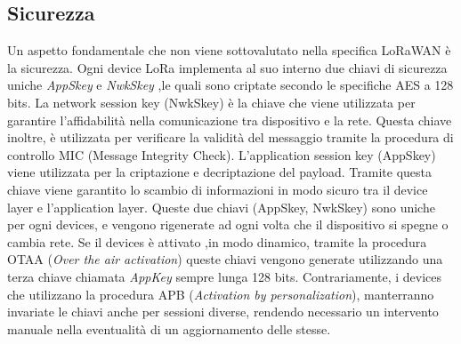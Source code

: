 \subsection{Sicurezza }
Un aspetto fondamentale che non viene sottovalutato nella specifica LoRaWAN è la
sicurezza. Ogni device LoRa implementa al suo interno due chiavi di sicurezza
uniche \emph{AppSkey} e \emph{NwkSkey} ,le quali sono criptate secondo le
specifiche AES a 128 bits.
La network session key (NwkSkey) è la chiave che viene utilizzata per garantire
l'affidabilità nella comunicazione tra dispositivo e la rete. Questa chiave
inoltre, è utilizzata per verificare la validità del messaggio tramite la
procedura di controllo MIC (Message Integrity Check). 
L'application session key (AppSkey) viene utilizzata per la criptazione e
decriptazione del payload. Tramite questa chiave viene garantito lo scambio di informazioni 
in modo sicuro tra il device layer e l'application layer. 
Queste due chiavi (AppSkey, NwkSkey) sono uniche per ogni devices, e vengono
rigenerate ad ogni volta che il dispositivo si spegne o cambia rete. 
Se il devices è attivato ,in modo dinamico, tramite
la procedura OTAA (\emph{Over the air activation}) queste chiavi vengono
generate utilizzando una terza chiave chiamata \emph{AppKey} sempre lunga
128 bits. Contrariamente, i devices che utilizzano la procedura APB
(\emph{Activation by personalization}), manterranno invariate le chiavi anche per
sessioni diverse, rendendo necessario un intervento manuale nella eventualità di
un aggiornamento delle stesse.

